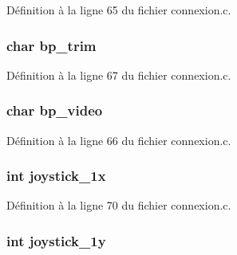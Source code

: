 Définition à la ligne 65 du fichier connexion.\-c.

\hypertarget{structetat__commandes_adc9e1c40950878e4b174300aef5c8628}{
\subsubsection[{bp\-\_\-trim}]{\setlength{\rightskip}{0pt plus 5cm}char bp\-\_\-trim}}\label{structetat__commandes_adc9e1c40950878e4b174300aef5c8628}


Définition à la ligne 67 du fichier connexion.\-c.

\hypertarget{structetat__commandes_a9f65380fb32037e5147720cbd1c20cad}{
\subsubsection[{bp\-\_\-video}]{\setlength{\rightskip}{0pt plus 5cm}char bp\-\_\-video}}\label{structetat__commandes_a9f65380fb32037e5147720cbd1c20cad}


Définition à la ligne 66 du fichier connexion.\-c.

\hypertarget{structetat__commandes_aefd8dcb52ec6c8b5014e4e4a07ce36f5}{
\subsubsection[{joystick\-\_\-1x}]{\setlength{\rightskip}{0pt plus 5cm}int joystick\-\_\-1x}}\label{structetat__commandes_aefd8dcb52ec6c8b5014e4e4a07ce36f5}


Définition à la ligne 70 du fichier connexion.\-c.

\hypertarget{structetat__commandes_a44464264b58e816437b75338c8071db7}{
\subsubsection[{joystick\-\_\-1y}]{\setlength{\rightskip}{0pt plus 5cm}int joystick\-\_\-1y}}\label{structetat__commandes_a44464264b58e816437b75338c8071db7}


